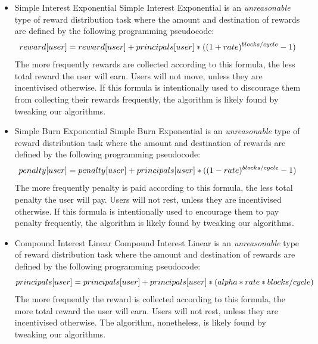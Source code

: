 \documentclass{article}
\begin{document}
\begin{itemize}
  \item Simple Interest Exponential \newline
  \label{sec:SimpleInterestExponential}
  Simple Interest Exponential is an \textit{unreasonable} type of reward distribution task 
  where the amount and destination of rewards are defined by the following programming 
  pseudocode:
  \begin{equation} \label{eq:SimpleInterestExponential}
    \\reward[user] = reward[user] + principals[user] * ((1+rate)^{blocks/cycle}-1)
  \end{equation}
  The more frequently rewards are collected according to this formula, 
  the less total reward the user will earn. Users will not move, unless they are incentivised otherwise.
  If this formula is intentionally used to discourage them from collecting their rewards frequently, 
  the algorithm is likely found by tweaking our algorithms.
  
  \item Simple Burn Exponential \newline
  \label{sec:SimpleBurnExponential}
  Simple Burn Exponential is an \textit{unreasonable} type of reward distribution task 
  where the amount and destination of rewards are defined by the following programming 
  pseudocode:  
  \begin{equation} \label{eq:SimpleBurnExponential}
    \\penalty[user] = penalty[user] + principals[user] * ((1-rate)^{blocks/cycle}-1)
  \end{equation}
  The more frequently penalty is paid according to this formula, 
  the less total penalty the user will pay. Users will not rest, unless they are incentivised otherwise. 
  If this formula is intentionally used to encourage them to pay penalty frequently, 
  the algorithm is likely found by tweaking our algorithms.
  
  \item Compound Interest Linear \newline
  \label{sec:CompoundleInterestLinear}
  Compound Interest Linear is an \textit{unreasonable} type of reward distribution task 
  where the amount and destination of rewards are defined by the following programming 
  pseudocode:
  \begin{equation} \label{eq:CompoundleInterestLinear}
    \\principals[user] = principals[user] + principals[user] * (alpha * rate * blocks/cycle)
  \end{equation}
  The more frequently the reward is collected according to this formula, 
  the more total reward the user will earn. Users will not rest, unless they are incentivised otherwise.
  The algorithm, nonetheless, is likely found by tweaking our algorithms.
  

\end{itemize}
\end{document}
